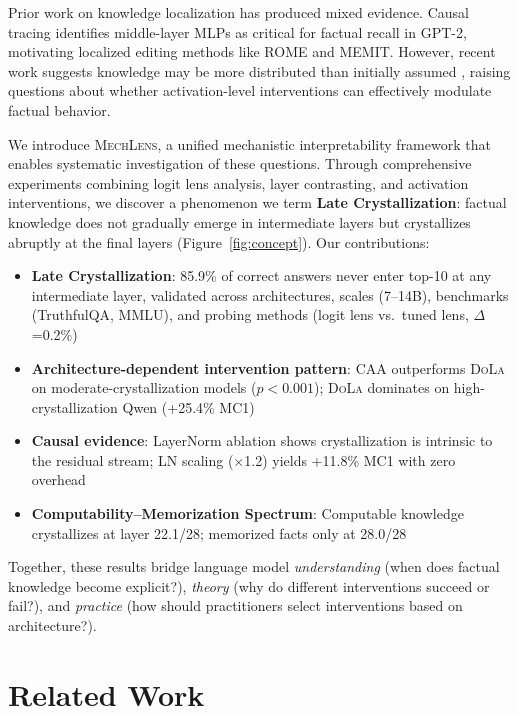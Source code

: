 \documentclass{article}
\newcommand{\mechlens}{\textsc{MechLens}}
\newcommand{\dola}{\textsc{DoLa}}
\newcommand{\caa}{\textsc{CAA}}
\begin{document}
Prior work on knowledge localization has produced mixed evidence. Causal tracing \citep{meng2022locating} identifies middle-layer MLPs as critical for factual recall in GPT-2, motivating localized editing methods like ROME and MEMIT. However, recent work suggests knowledge may be more distributed than initially assumed \citep{geva2022transformer}, raising questions about whether activation-level interventions can effectively modulate factual behavior.

We introduce \mechlens{}, a unified mechanistic interpretability framework that enables systematic investigation of these questions. Through comprehensive experiments combining logit lens analysis, layer contrasting, and activation interventions, we discover a phenomenon we term \textbf{Late Crystallization}: factual knowledge does not gradually emerge in intermediate layers but crystallizes abruptly at the final layers (Figure~\ref{fig:concept}). Our contributions:

\begin{itemize}
    \item \textbf{Late Crystallization}: 85.9\% of correct answers never enter top-10 at any intermediate layer, validated across architectures, scales (7--14B), benchmarks (TruthfulQA, MMLU), and probing methods (logit lens vs.\ tuned lens, $\Delta$=0.2\%)
    \item \textbf{Architecture-dependent intervention pattern}: \caa{} outperforms \dola{} on moderate-crystallization models ($p{<}0.001$); \dola{} dominates on high-crystallization Qwen (+25.4\% MC1)
    \item \textbf{Causal evidence}: LayerNorm ablation shows crystallization is intrinsic to the residual stream; LN scaling ($\times$1.2) yields +11.8\% MC1 with zero overhead
    \item \textbf{Computability--Memorization Spectrum}: Computable knowledge crystallizes at layer 22.1/28; memorized facts only at 28.0/28
\end{itemize}

Together, these results bridge language model \emph{understanding} (when does factual knowledge become explicit?), \emph{theory} (why do different interventions succeed or fail?), and \emph{practice} (how should practitioners select interventions based on architecture?).

\section{Related Work}
\label{sec:related}
\end{document}
